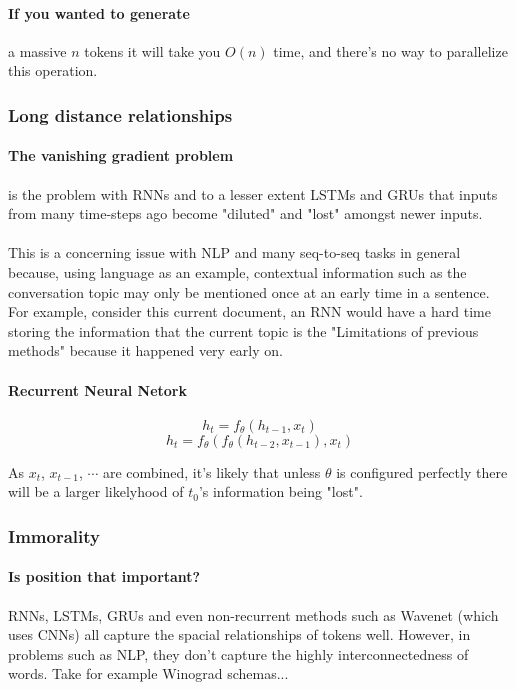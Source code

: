 \documentclass{article}
\begin{document}
    \paragraph{If you wanted to generate} a massive $n$ tokens it will take you $O(n)$ time, and there's no way to parallelize this operation.

    \subsubsection{Long distance relationships}
    
    \paragraph{The vanishing gradient problem} is the problem with RNNs and to a lesser extent LSTMs and GRUs that inputs from many time-steps ago become "diluted" and "lost" amongst newer inputs.
    \paragraph{} This is a concerning issue with NLP and many seq-to-seq tasks in general because, using language as an example, contextual information such as the conversation topic may only be mentioned once at an early time in a sentence. For example, consider this current document, an RNN would have a hard time storing the information that the current topic is the "Limitations of previous methods" because it happened very early on.

    \paragraph{Recurrent Neural Netork}

    $$h_t = f_\theta(h_{t-1}, x_t)$$
    $$h_t = f_\theta(f_\theta(h_{t-2}, x_{t-1}), x_t)$$
    
        As $x_t$, $x_{t-1}$, $\cdots$ are combined, it's likely that unless $\theta$ is configured perfectly there will be a larger likelyhood of $t_0$'s information being "lost".

    \subsubsection{Immorality}

    \paragraph{Is position that important?} RNNs, LSTMs, GRUs and even non-recurrent methods such as Wavenet (which uses CNNs) all capture the spacial relationships of tokens well. However, in problems such as NLP, they don't capture the highly interconnectedness of words. Take for example Winograd schemas...
\end{document}
